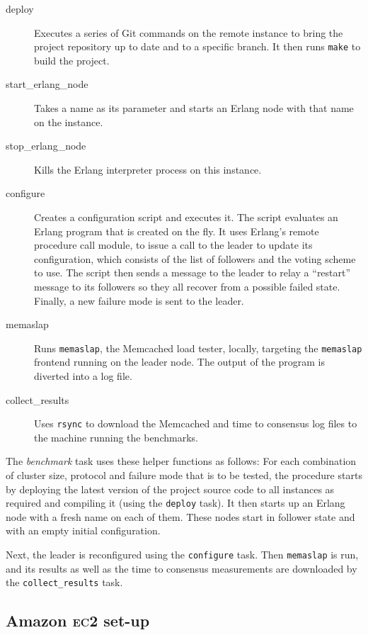 \documentclass[12pt,chapterprefix=true,toc=bibliography,numbers=noendperiod,
               footnotes=multiple,twoside]{scrreprt}
\newcommand{\ECC}[0]{\textsc{ec}2 }
\begin{document}
\begin{description}
    \item[deploy] Executes a series of Git commands on the remote instance to bring the project repository up to date and to a specific branch. It then runs \texttt{make} to build the project.
    \item[start\_erlang\_node] Takes a name as its parameter and starts an Erlang node with that name on the instance.
    \item[stop\_erlang\_node] Kills the Erlang interpreter process on this instance.
    \item[configure] Creates a configuration script and executes it. The script evaluates an Erlang program that is created on the fly. It uses Erlang's remote procedure call module, to issue a call to the leader to update its configuration, which consists of the list of followers and the voting scheme to use. The script then sends a message to the leader to relay a \enquote{restart} message to its followers so they all recover from a possible failed state. Finally, a new failure mode is sent to the leader.
    \item[memaslap] Runs \texttt{memaslap}, the Memcached load tester, locally, targeting the \texttt{memaslap} frontend running on the leader node. The output of the program is diverted into a log file.
    \item[collect\_results] Uses \texttt{rsync} to download the Memcached and time to consensus log files to the machine running the benchmarks.
\end{description}

The \textit{benchmark} task uses these helper functions as follows: For each combination of cluster size, protocol and failure mode that is to be tested, the procedure starts by deploying the latest version of the project source code to all instances as required and compiling it (using the \texttt{deploy} task). It then starts up an Erlang node with a fresh name on each of them. These nodes start in follower state and with an empty initial configuration.

Next, the leader is reconfigured using the \texttt{configure} task. Then \texttt{memaslap} is run, and its results as well as the time to consensus measurements are downloaded by the \texttt{collect\_results} task.

\subsection[Amazon EC2 set-up]{Amazon \ECC set-up}
\end{document}
